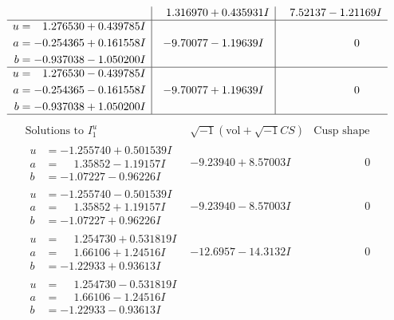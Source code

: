\documentclass[1p]{elsarticle_modified}
\theoremstyle{definition}
\newcommand{\I}{\sqrt{-1}}
\begin{document}
$$\begin{array}{c|c|c}
 & \phantom{-}1.316970 + 0.435931 I & \phantom{-}7.52137 - 1.21169 I \\ \hline\begin{aligned}
u &= \phantom{-}1.276530 + 0.439785 I \\
a &= -0.254365 + 0.161558 I \\
b &= -0.937038 - 1.050200 I\end{aligned}
 & -9.70077 - 1.19639 I & \phantom{-0.000000 } 0 \\ \hline\begin{aligned}
u &= \phantom{-}1.276530 - 0.439785 I \\
a &= -0.254365 - 0.161558 I \\
b &= -0.937038 + 1.050200 I\end{aligned}
 & -9.70077 + 1.19639 I & \phantom{-0.000000 } 0\\
 \hline 
 \end{array}$$\newpage$$\begin{array}{c|c|c}  
\text{Solutions to }I^u_{1}& \I (\text{vol} + \sqrt{-1}CS) & \text{Cusp shape}\\
 \hline 
\begin{aligned}
u &= -1.255740 + 0.501539 I \\
a &= \phantom{-}1.35852 - 1.19157 I \\
b &= -1.07227 - 0.96226 I\end{aligned}
 & -9.23940 + 8.57003 I & \phantom{-0.000000 } 0 \\ \hline\begin{aligned}
u &= -1.255740 - 0.501539 I \\
a &= \phantom{-}1.35852 + 1.19157 I \\
b &= -1.07227 + 0.96226 I\end{aligned}
 & -9.23940 - 8.57003 I & \phantom{-0.000000 } 0 \\ \hline\begin{aligned}
u &= \phantom{-}1.254730 + 0.531819 I \\
a &= \phantom{-}1.66106 + 1.24516 I \\
b &= -1.22933 + 0.93613 I\end{aligned}
 & -12.6957 - 14.3132 I & \phantom{-0.000000 } 0 \\ \hline\begin{aligned}
u &= \phantom{-}1.254730 - 0.531819 I \\
a &= \phantom{-}1.66106 - 1.24516 I \\
b &= -1.22933 - 0.93613 I\end{aligned}

\end{array}$$
\end{document}
